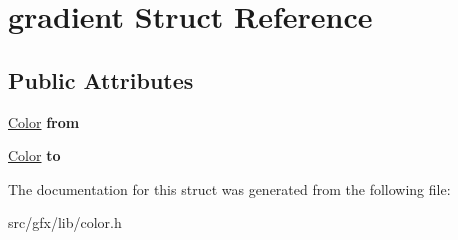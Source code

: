 \hypertarget{structgradient}{}\section{gradient Struct Reference}
\label{structgradient}
\subsection*{Public Attributes}
\begin{DoxyCompactItemize}
\item 
\mbox{\label{structgradient_a77a8d652c1ce0bd0f72fb23a966798ca}} 
\hyperlink{structcolor}{Color} {\bfseries from}
\item 
\mbox{\label{structgradient_a1ed8669bbea23155dd0236e63e0f0607}} 
\hyperlink{structcolor}{Color} {\bfseries to}
\end{DoxyCompactItemize}


The documentation for this struct was generated from the following file\+:\begin{DoxyCompactItemize}
\item 
src/gfx/lib/color.\+h\end{DoxyCompactItemize}
